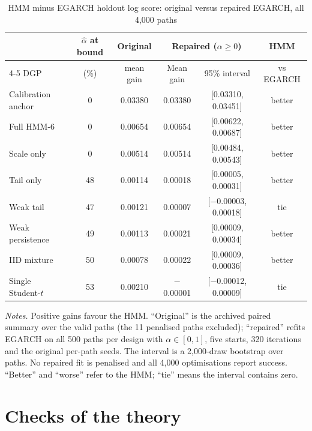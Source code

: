 \documentclass[11pt,a4paper]{article}
\theoremstyle{plain}
\theoremstyle{remark}
\begin{document}
\begin{table}[ht]
\centering\small
\caption{HMM minus EGARCH holdout log score: original versus repaired EGARCH, all 4{,}000 paths}\label{tab:egarchgrid}
\begin{tabular}{lccccc}
\toprule
 & $\hat\alpha$ at bound & Original & \multicolumn{2}{c}{Repaired ($\alpha\ge0$)} & HMM\\
\cmidrule(lr){4-5}
DGP & (\%) & mean gain & Mean gain & 95\% interval & vs EGARCH\\
\midrule
Calibration anchor & 0 & 0.03380 & 0.03380 & [0.03310, 0.03451] & better\\
Full HMM-6 & 0 & 0.00654 & 0.00654 & [0.00622, 0.00687] & better\\
Scale only & 0 & 0.00514 & 0.00514 & [0.00484, 0.00543] & better\\
Tail only & 48 & 0.00114 & 0.00018 & [0.00005, 0.00031] & better\\
Weak tail & 47 & 0.00121 & 0.00007 & [$-$0.00003, 0.00018] & tie\\
Weak persistence & 49 & 0.00113 & 0.00021 & [0.00009, 0.00034] & better\\
IID mixture & 50 & 0.00078 & 0.00022 & [0.00009, 0.00036] & better\\
Single Student-$t$ & 53 & 0.00210 & $-$0.00001 & [$-$0.00012, 0.00009] & tie\\
\bottomrule
\end{tabular}
\par\smallskip\footnotesize\emph{Notes.} Positive gains favour the HMM. ``Original'' is the archived paired summary over the valid paths (the 11 penalised paths excluded); ``repaired'' refits EGARCH on all 500 paths per design with $\alpha\in[0,1]$, five starts, 320 iterations and the original per-path seeds. The interval is a 2{,}000-draw bootstrap over paths. No repaired fit is penalised and all 4{,}000 optimisations report success. ``Better'' and ``worse'' refer to the HMM; ``tie'' means the interval contains zero.
\end{table}
\section{Checks of the theory}\label{sec:explain}
\end{document}
